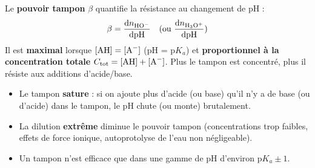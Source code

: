 \documentclass[11pt]{article}
\begin{document}
\begin{propriete}
Le \textbf{pouvoir tampon} $\beta$ quantifie la résistance au changement de pH :
\[
\beta = \frac{\mathrm{d}n_{\ce{HO-}}}{\mathrm{dpH}} \quad (\text{ou } \frac{\mathrm{d}n_{\ce{H3O+}}}{\mathrm{dpH}})
\]
Il est \textbf{maximal} lorsque $[\ce{AH}] = [\ce{A-}]$ (pH = $\mathrm{p}K_a$) et \textbf{proportionnel à la concentration totale} $C_{\text{tot}} = [\ce{AH}] + [\ce{A-}]$. Plus le tampon est concentré, plus il résiste aux additions d'acide/base.
\end{propriete}

\begin{attention}
\begin{itemize}
  \item Le tampon \textbf{sature} : si on ajoute plus d'acide (ou base) qu'il n'y a de base (ou d'acide) dans le tampon, le pH chute (ou monte) brutalement.
  \item La dilution \textbf{extrême} diminue le pouvoir tampon (concentrations trop faibles, effets de force ionique, autoprotolyse de l'eau non négligeable).
  \item Un tampon n'est efficace que dans une gamme de pH d'environ $\mathrm{p}K_a \pm 1$.
\end{itemize}
\end{attention}
\end{document}
